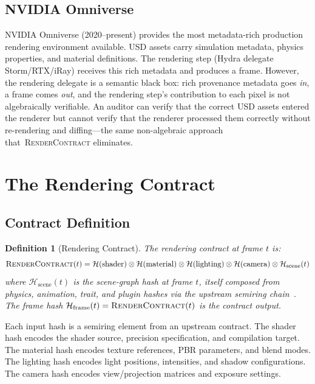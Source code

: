 \documentclass[sigconf,nonacm]{acmart}
\newcommand{\rendercontract}{\textsc{RenderContract}}
\newcommand{\hashfn}{\mathcal{H}}
\newcommand{\tropmult}{\otimes}
\newcommand{\framehash}{\hashfn_{\text{frame}}}
\newcommand{\scenehash}{\hashfn_{\text{scene}}}
\newtheorem{definition}{Definition}
\begin{document}
\subsection{NVIDIA Omniverse}
NVIDIA Omniverse (2020--present) provides the most
metadata-rich production rendering environment available.
USD assets carry simulation metadata, physics properties,
and material definitions. The rendering step (Hydra delegate
\textrightarrow{} Storm/RTX/iRay) receives this rich metadata
and produces a frame. However, the rendering delegate is a
semantic black box: rich provenance metadata goes \emph{in},
a frame comes \emph{out}, and the rendering step's
contribution to each pixel is not algebraically verifiable.
An auditor can verify that the correct USD assets entered
the renderer but cannot verify that the renderer processed
them correctly without re-rendering and diffing---the same
non-algebraic approach that~\rendercontract{} eliminates.

\section{The Rendering Contract}
\label{sec:contract}

\subsection{Contract Definition}

\begin{definition}[Rendering Contract]
The rendering contract at frame $t$ is:
$$\rendercontract(t) = \hashfn(\text{shader})
  \tropmult \hashfn(\text{material})
  \tropmult \hashfn(\text{lighting})
  \tropmult \hashfn(\text{camera})
  \tropmult \scenehash(t)$$
where $\scenehash(t)$ is the scene-graph hash at frame $t$,
itself composed from physics, animation, trait, and plugin
hashes via the upstream semiring
chain~\cite{trustbyconstruction2026,paper-10-hs-core-pldi2027}.
The frame hash $\framehash(t) = \rendercontract(t)$ is the
contract output.
\end{definition}

Each input hash is a semiring element from an upstream
contract. The shader hash encodes the shader source, precision
specification, and compilation target. The material hash
encodes texture references, PBR parameters, and blend modes.
The lighting hash encodes light positions, intensities, and
shadow configurations. The camera hash encodes view/projection
matrices and exposure settings.
\end{document}
